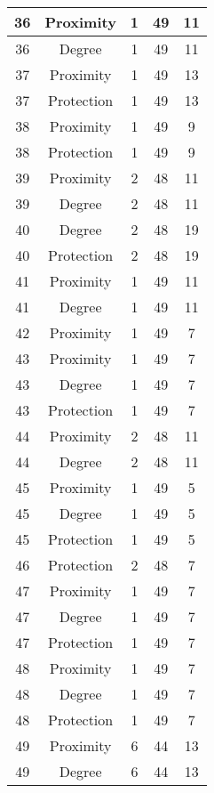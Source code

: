 \documentclass[results.tex]{subfiles}
\begin{document}
\begin{center}
\begin{tabular}{| c || c | c | c | c |}
    \hline
    36 & Proximity & 1 & 49 & 11 \\ 
    \hline
    36 & Degree & 1 & 49 & 11 \\ 
    \hline
    37 & Proximity & 1 & 49 & 13 \\ 
    \hline
    37 & Protection & 1 & 49 & 13 \\ 
    \hline
    38 & Proximity & 1 & 49 & 9 \\ 
    \hline
    38 & Protection & 1 & 49 & 9 \\ 
    \hline
    39 & Proximity & 2 & 48 & 11 \\ 
    \hline
    39 & Degree & 2 & 48 & 11 \\ 
    \hline
    40 & Degree & 2 & 48 & 19 \\ 
    \hline
    40 & Protection & 2 & 48 & 19 \\ 
    \hline
    41 & Proximity & 1 & 49 & 11 \\ 
    \hline
    41 & Degree & 1 & 49 & 11 \\ 
    \hline
    42 & Proximity & 1 & 49 & 7 \\ 
    \hline
    43 & Proximity & 1 & 49 & 7 \\ 
    \hline
    43 & Degree & 1 & 49 & 7 \\ 
    \hline
    43 & Protection & 1 & 49 & 7 \\ 
    \hline
    44 & Proximity & 2 & 48 & 11 \\ 
    \hline
    44 & Degree & 2 & 48 & 11 \\ 
    \hline
    45 & Proximity & 1 & 49 & 5 \\ 
    \hline
    45 & Degree & 1 & 49 & 5 \\ 
    \hline
    45 & Protection & 1 & 49 & 5 \\ 
    \hline
    46 & Protection & 2 & 48 & 7 \\ 
    \hline
    47 & Proximity & 1 & 49 & 7 \\ 
    \hline
    47 & Degree & 1 & 49 & 7 \\ 
    \hline
    47 & Protection & 1 & 49 & 7 \\ 
    \hline
    48 & Proximity & 1 & 49 & 7 \\ 
    \hline
    48 & Degree & 1 & 49 & 7 \\ 
    \hline
    48 & Protection & 1 & 49 & 7 \\ 
    \hline
    49 & Proximity & 6 & 44 & 13 \\ 
    \hline
    49 & Degree & 6 & 44 & 13 \\ 
    \hline   \end{tabular}
\end{center}
\end{document}
